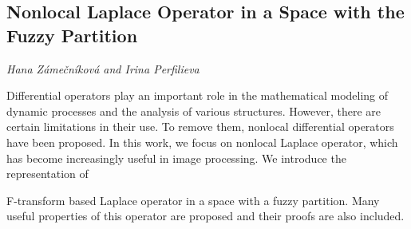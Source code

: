 \documentclass[../booklet.tex]{subfiles}
\begin{document}
\subsection[Nonlocal Laplace Operator in a Space with the Fuzzy Partition. {\it Hana Zámečníková and Irina Perfilieva}]{Nonlocal Laplace Operator in a Space with the Fuzzy Partition}
 

\begin{center}
  {\it Hana Zámečníková and Irina Perfilieva}
\end{center}



Differential operators play an important role in the mathematical modeling of dynamic processes and the analysis of various structures. However, there are certain limitations in their use. To remove them, nonlocal differential operators have been proposed. In this work, we focus on nonlocal Laplace operator, which has become increasingly useful in image processing. We introduce the representation of 

F-transform based Laplace operator in a space with a fuzzy partition. Many useful properties of this operator are proposed and their proofs are also included.


\end{document}
